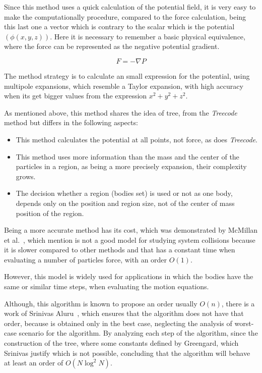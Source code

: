 Since this method uses a quick calculation of the potential field,
it is very easy to make the computationally procedure,
compared to the force calculation, being this last one
a vector which is contrary to the scalar which is the potential $(\phi (x, y, z))$.
Here it is necessary to remember a basic physical equivalence,
where the force can be represented as the negative potential gradient.

$$F = - \nabla P$$

The method strategy is to calculate an small expression
for the potential, using multipole expansions, which
resemble a Taylor expansion,
with high accuracy when its get bigger values
from the expression $x^{2}+y^{2}+z^{2}$.

As mentioned above,
this method shares the idea of tree,
from the \emph{Treecode} method
but differs in the following aspects:

\begin{itemize}
    \item This method calculates the potential at all points,
          not force, as does \emph{Treecode}.
    \item This method uses more information than the mass
          and the center of the particles in a region, as being
          a more precisely expansion, their complexity grows.
    \item The decision whether a region (bodies set) is used or not
          as one body, depends only on the position and region size,
          not of the center of mass position of the region.
\end{itemize}

Being a more accurate method has its cost,
which was demonstrated by McMillan et al.~\cite{mcmillan},
which mention is not a good model for studying system collisions because
it is slower compared to other methods and that has a constant time
when evaluating a number of particles force, with an order $O(1)$.

However, this model is widely used for applications in which the bodies
have the same or similar time steps, when evaluating the motion equations.

Although,
this algorithm is known to propose an order usually $O(n)$,
there is a work of Srinivas Aluru~\cite{srinivas},
which ensures that the algorithm does not have that order,
because is obtained only in the best case,
neglecting the analysis of worst-case scenario for the algorithm.
By analyzing each step of the algorithm,
since the construction of the tree,
where some constants defined by Greengard,
which Srinivas justify which is not possible,
concluding that the algorithm will behave
at least an order of $O(N \log^{2} N) $.
